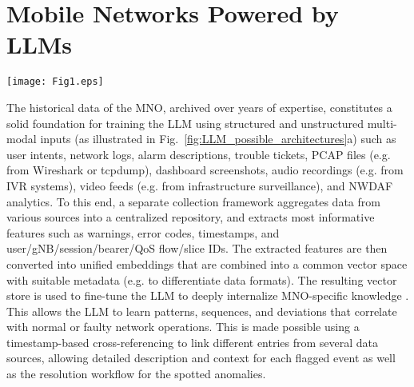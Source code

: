 \section{Mobile Networks Powered by \glspl{LLM}}
\label{sec:LLM_enabled_MNs}
\begin{figure*}[t!]
\centering
\texttt{[image: Fig1.eps]}
    \caption{Possible architectural designs for integrated \gls{LLM} and \gls{MNO} ecosystem.}
    \label{fig:LLM_possible_architectures}
\end{figure*}
The historical data of the \gls{MNO}, archived over years of expertise, constitutes a solid foundation for training the \gls{LLM} using structured and unstructured multi-modal inputs (as illustrated in Fig.~\ref{fig:LLM_possible_architectures}a) such as user intents, network logs, alarm descriptions, trouble tickets, \gls{PCAP} files (e.g. from Wireshark or tcpdump), dashboard screenshots, audio recordings (e.g. from \gls{IVR} systems), video feeds (e.g. from infrastructure surveillance), and \gls{NWDAF} analytics. To this end, a separate collection framework aggregates data from various sources into a centralized repository, and extracts most informative features such as warnings, error codes, timestamps, and user/gNB/session/bearer/\gls{QoS} flow/slice IDs. The extracted features are then converted into unified embeddings that are combined into a common vector space with suitable metadata (e.g. to differentiate data formats). The resulting vector store is used to fine-tune the \gls{LLM} to deeply internalize \gls{MNO}-specific knowledge \cite{Bariah2023understanding}. This allows the \gls{LLM} to learn patterns, sequences, and deviations that correlate with normal or faulty network operations. This is made possible using a timestamp-based cross-referencing to link different entries from several data sources, allowing detailed description and context for each flagged event as well as the resolution workflow for the spotted anomalies.

